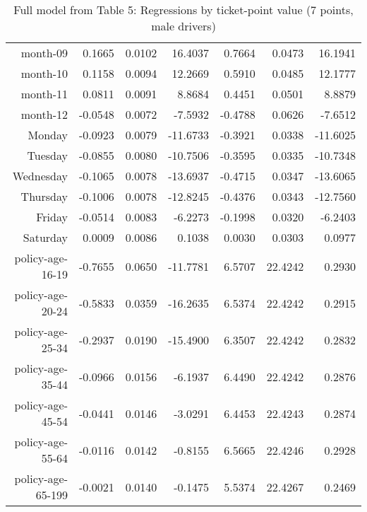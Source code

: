 \documentclass[10pt]{article}
\begin{document}
\begin{table}[ht]
\begin{tabular}{rrrrrrr}
  month-09 & 0.1665 & 0.0102 & 16.4037 & 0.7664 & 0.0473 & 16.1941 \\ 
  month-10 & 0.1158 & 0.0094 & 12.2669 & 0.5910 & 0.0485 & 12.1777 \\ 
  month-11 & 0.0811 & 0.0091 & 8.8684 & 0.4451 & 0.0501 & 8.8879 \\ 
  month-12 & -0.0548 & 0.0072 & -7.5932 & -0.4788 & 0.0626 & -7.6512 \\ 
  Monday & -0.0923 & 0.0079 & -11.6733 & -0.3921 & 0.0338 & -11.6025 \\ 
  Tuesday & -0.0855 & 0.0080 & -10.7506 & -0.3595 & 0.0335 & -10.7348 \\ 
  Wednesday & -0.1065 & 0.0078 & -13.6937 & -0.4715 & 0.0347 & -13.6065 \\ 
  Thursday & -0.1006 & 0.0078 & -12.8245 & -0.4376 & 0.0343 & -12.7560 \\ 
  Friday & -0.0514 & 0.0083 & -6.2273 & -0.1998 & 0.0320 & -6.2403 \\ 
  Saturday & 0.0009 & 0.0086 & 0.1038 & 0.0030 & 0.0303 & 0.0977 \\ 
  policy-age-16-19 & -0.7655 & 0.0650 & -11.7781 & 6.5707 & 22.4242 & 0.2930 \\ 
  policy-age-20-24 & -0.5833 & 0.0359 & -16.2635 & 6.5374 & 22.4242 & 0.2915 \\ 
  policy-age-25-34 & -0.2937 & 0.0190 & -15.4900 & 6.3507 & 22.4242 & 0.2832 \\ 
  policy-age-35-44 & -0.0966 & 0.0156 & -6.1937 & 6.4490 & 22.4242 & 0.2876 \\ 
  policy-age-45-54 & -0.0441 & 0.0146 & -3.0291 & 6.4453 & 22.4243 & 0.2874 \\ 
  policy-age-55-64 & -0.0116 & 0.0142 & -0.8155 & 6.5665 & 22.4246 & 0.2928 \\ 
  policy-age-65-199 & -0.0021 & 0.0140 & -0.1475 & 5.5374 & 22.4267 & 0.2469 \\ 
   \hline
\end{tabular}
\caption{Full model from Table 5: Regressions by ticket-point value (7 points, male drivers)} 
\label{tab_5_7_pts_M}
\end{table}


\clearpage
\pagebreak



\end{document}
